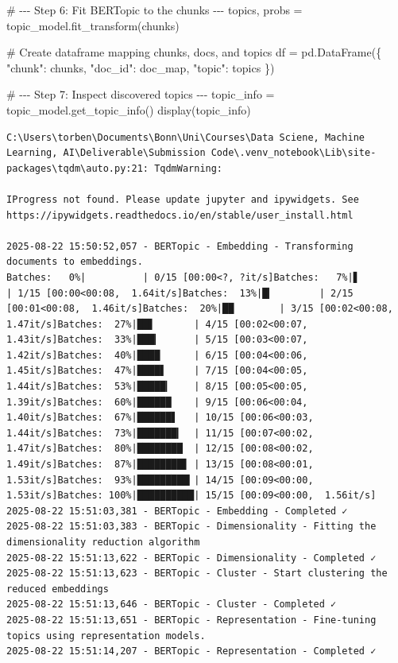 \documentclass[
  letterpaper,
  DIV=11,
  numbers=noendperiod]{scrartcl}
\newenvironment{Shaded}{\begin{snugshade}}{\end{snugshade}}
\newcommand{\CommentTok}[1]{\textcolor[rgb]{0.37,0.37,0.37}{#1}}
\newcommand{\NormalTok}[1]{\textcolor[rgb]{0.00,0.23,0.31}{#1}}
\newcommand{\OperatorTok}[1]{\textcolor[rgb]{0.37,0.37,0.37}{#1}}
\newcommand{\StringTok}[1]{\textcolor[rgb]{0.13,0.47,0.30}{#1}}
\begin{document}
\begin{Shaded}
\begin{Highlighting}[]
\CommentTok{\# {-}{-}{-} Step 6: Fit BERTopic to the chunks {-}{-}{-}}
\NormalTok{topics, probs }\OperatorTok{=}\NormalTok{ topic\_model.fit\_transform(chunks)}

\CommentTok{\# Create dataframe mapping chunks, docs, and topics}
\NormalTok{df }\OperatorTok{=}\NormalTok{ pd.DataFrame(\{}
    \StringTok{"chunk"}\NormalTok{: chunks,}
    \StringTok{"doc\_id"}\NormalTok{: doc\_map,}
    \StringTok{"topic"}\NormalTok{: topics}
\NormalTok{\})}

\CommentTok{\# {-}{-}{-} Step 7: Inspect discovered topics {-}{-}{-}}
\NormalTok{topic\_info }\OperatorTok{=}\NormalTok{ topic\_model.get\_topic\_info()}
\NormalTok{display(topic\_info)}
\end{Highlighting}
\end{Shaded}

\begin{verbatim}
C:\Users\torben\Documents\Bonn\Uni\Courses\Data Sciene, Machine Learning, AI\Deliverable\Submission Code\.venv_notebook\Lib\site-packages\tqdm\auto.py:21: TqdmWarning:

IProgress not found. Please update jupyter and ipywidgets. See https://ipywidgets.readthedocs.io/en/stable/user_install.html

2025-08-22 15:50:52,057 - BERTopic - Embedding - Transforming documents to embeddings.
Batches:   0%|          | 0/15 [00:00<?, ?it/s]Batches:   7%|▋         | 1/15 [00:00<00:08,  1.64it/s]Batches:  13%|█▎        | 2/15 [00:01<00:08,  1.46it/s]Batches:  20%|██        | 3/15 [00:02<00:08,  1.47it/s]Batches:  27%|██▋       | 4/15 [00:02<00:07,  1.43it/s]Batches:  33%|███▎      | 5/15 [00:03<00:07,  1.42it/s]Batches:  40%|████      | 6/15 [00:04<00:06,  1.45it/s]Batches:  47%|████▋     | 7/15 [00:04<00:05,  1.44it/s]Batches:  53%|█████▎    | 8/15 [00:05<00:05,  1.39it/s]Batches:  60%|██████    | 9/15 [00:06<00:04,  1.40it/s]Batches:  67%|██████▋   | 10/15 [00:06<00:03,  1.44it/s]Batches:  73%|███████▎  | 11/15 [00:07<00:02,  1.47it/s]Batches:  80%|████████  | 12/15 [00:08<00:02,  1.49it/s]Batches:  87%|████████▋ | 13/15 [00:08<00:01,  1.53it/s]Batches:  93%|█████████▎| 14/15 [00:09<00:00,  1.53it/s]Batches: 100%|██████████| 15/15 [00:09<00:00,  1.56it/s]
2025-08-22 15:51:03,381 - BERTopic - Embedding - Completed ✓
2025-08-22 15:51:03,383 - BERTopic - Dimensionality - Fitting the dimensionality reduction algorithm
2025-08-22 15:51:13,622 - BERTopic - Dimensionality - Completed ✓
2025-08-22 15:51:13,623 - BERTopic - Cluster - Start clustering the reduced embeddings
2025-08-22 15:51:13,646 - BERTopic - Cluster - Completed ✓
2025-08-22 15:51:13,651 - BERTopic - Representation - Fine-tuning topics using representation models.
2025-08-22 15:51:14,207 - BERTopic - Representation - Completed ✓
\end{verbatim}
\end{document}
